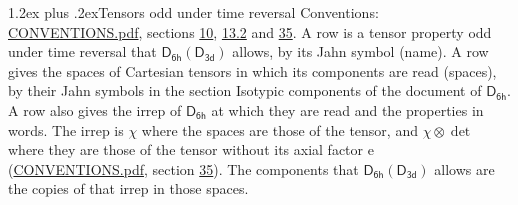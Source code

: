 \documentclass[10pt,a4paper]{article}
\makeatletter
\renewcommand\section{\@startsection{section}{1}{\z@}{-3ex plus -1ex minus -.2ex}%
  {1.2ex plus .2ex}{\normalfont\large\sffamily\bfseries\color{parttitle}}}
\numberwithin{equation}{section}
\newcommand{\grp}[1]{\mathsf{#1}}
\newcommand{\irrprod}{\otimes}
\makeatother
\begin{document}
\section{Tensors odd under time reversal}\label{s:time_odd}
Conventions: \href{../../CONVENTIONS.pdf}{CONVENTIONS.pdf}, sections \href{../../../rotation/CONVENTIONS.pdf\#conv.10}{10}, \href{../../../rotation/CONVENTIONS.pdf\#conv.13.2}{13.2} and \href{../../CONVENTIONS.pdf\#conv.35}{35}.
\leavevmode\label{n:head.name.property}A row is a tensor property odd under time reversal that $\grp{D_{6h}}(\grp{D_{3d}})$ allows, by its Jahn symbol (name). \label{n:head.spaces}A row gives the spaces of Cartesian tensors in which its components are read (spaces), by their Jahn symbols in the section Isotypic components of the document of \href{../../../rotation/data/pdf/D6h.pdf}{$\grp{D_{6h}}$}. \label{n:head.properties}A row also gives the irrep of $\grp{D_{6h}}$ at which they are read and the properties in words. The irrep is $\chi$ where the spaces are those of the tensor, and $\chi \irrprod \det$ where they are those of the tensor without its axial factor e (\href{../../CONVENTIONS.pdf}{CONVENTIONS.pdf}, section \href{../../CONVENTIONS.pdf\#conv.35}{35}). The components that $\grp{D_{6h}}(\grp{D_{3d}})$ allows are the copies of that irrep in those spaces.
\end{document}
